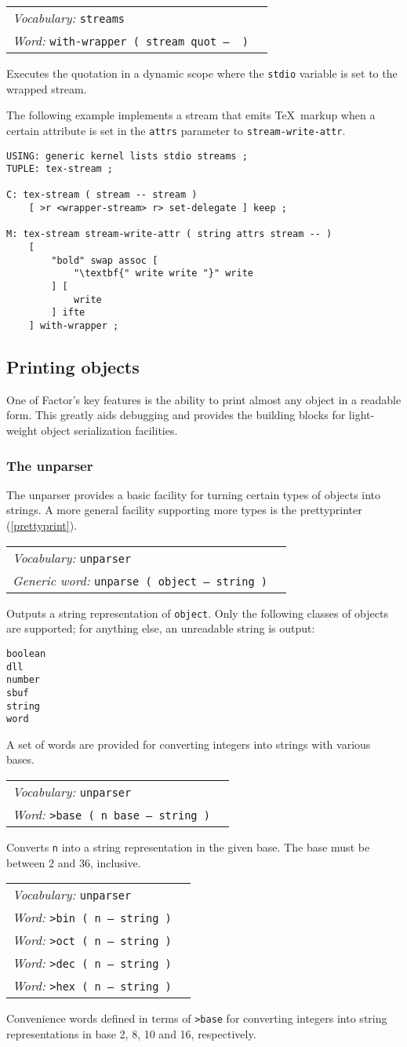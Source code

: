 \documentclass{book}
\newcommand{\vocabulary}[1]{\emph{Vocabulary:} \texttt{#1}&\\}
\newcommand{\ordinaryword}[2]{\index{\texttt{#1}}\emph{Word:} \texttt{#2}&\\}
\newcommand{\genericword}[2]{\index{\texttt{#1}}\emph{Generic word:} \texttt{#2}&\\}
\newcommand{\wordtable}[1]{

\begin{tabularx}{12cm}[t]{lX}
\hline
#1
\hline
\end{tabularx}

}
\begin{document}
\wordtable{
\vocabulary{streams}
\ordinaryword{with-wrapper}{with-wrapper~( stream quot -- ~)}
}
Executes the quotation in a dynamic scope where the \texttt{stdio} variable is set to the wrapped stream.

The following example implements a stream that emits \TeX\ markup when a certain attribute is set in the \texttt{attrs} parameter to \texttt{stream-write-attr}.

\begin{verbatim}
USING: generic kernel lists stdio streams ;
TUPLE: tex-stream ;

C: tex-stream ( stream -- stream )
    [ >r <wrapper-stream> r> set-delegate ] keep ;

M: tex-stream stream-write-attr ( string attrs stream -- )
    [
        "bold" swap assoc [
            "\textbf{" write write "}" write
        ] [
            write
        ] ifte
    ] with-wrapper ;
\end{verbatim}

\subsection{Printing objects}


One of Factor's key features is the ability to print almost any object in a readable form. This greatly aids debugging and provides the building blocks for light-weight object serialization facilities.

\subsubsection{The unparser}

The unparser provides a basic facility for turning certain types of objects into strings. A more general facility supporting more types is the prettyprinter (\ref{prettyprint}).

\wordtable{
\vocabulary{unparser}
\genericword{unparse}{unparse~( object -- string~)}
}
Outputs a string representation of \texttt{object}. Only the following classes of objects are supported; for anything else, an unreadable string is output:
\begin{verbatim}
boolean
dll
number
sbuf
string
word
\end{verbatim}
A set of words are provided for converting integers into strings with various bases.
\wordtable{
\vocabulary{unparser}
\ordinaryword{>base}{>base~( n base -- string~)}
}
Converts \texttt{n} into a string representation in the given base. The base must be between 2 and 36, inclusive.
\wordtable{
\vocabulary{unparser}
\ordinaryword{>bin}{>bin~( n -- string~)}
\ordinaryword{>oct}{>oct~( n -- string~)}
\ordinaryword{>dec}{>dec~( n -- string~)}
\ordinaryword{>hex}{>hex~( n -- string~)}
}
Convenience words defined in terms of \texttt{>base} for converting integers into string representations in base 2, 8, 10 and 16, respectively.
\end{document}
